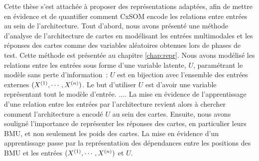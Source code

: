 Cette thèse s'est attachée à proposer des représentations adaptées, afin de mettre en évidence et de quantifier comment CxSOM encode les relations entre entrées au sein de l'architecture.
Tout d'abord, nous avons présenté une méthode d'analyse de l'architecture de cartes en modélisant les entrées multimodales et les réponses des cartes comme des variables aléatoires obtenues lors de phases de test. Cette méthode est présentée au chapitre \ref{chap:repr}.
Nous avons modélisé les relations entre les entrées sous forme d'une variable latente, $U$, paramétrant le modèle sans perte d'information~: $U$ est en bijection avec l'ensemble des entrées externes $(X^{({1})}, \cdots, X^{({n})})$. 
Le but d'utiliser $U$ est d'avoir une variable représentant tout le modèle d'entrée. ....
La mise en évidence de l'apprentissage d'une relation entre les entrées par l'architecture revient alors à chercher comment l'architecture a encodé $U$ au sein des cartes.
Ensuite, nous avons souligné l'importance de représenter les réponses des cartes, en particulier leurs BMU, et non seulement les poids des cartes. La mise en évidence d'un apprentissage passe par la représentation des dépendances entre les positions des BMU et les entrées $(X^{({1})}, \cdots, X^{({n})})$ et $U$.

